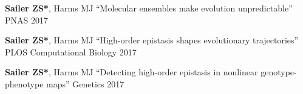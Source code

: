 

\begin{cvpublications}

  \cvpublication
    {\textbf{Sailer ZS*}, Harms MJ} %
    {``Molecular ensembles make evolution unpredictable''} %
    {PNAS} %
    {2017} %

  \cvpublication
    {\textbf{Sailer ZS*}, Harms MJ} %
    {``High-order epistasis shapes evolutionary trajectories''} %
    {PLOS Computational Biology} %
    {2017} %

  \cvpublication
    {\textbf{Sailer ZS*}, Harms MJ} %
    {``Detecting high-order epistasis in nonlinear genotype-phenotype maps''} %
    {Genetics} %
    {2017} %


\end{cvpublications}
